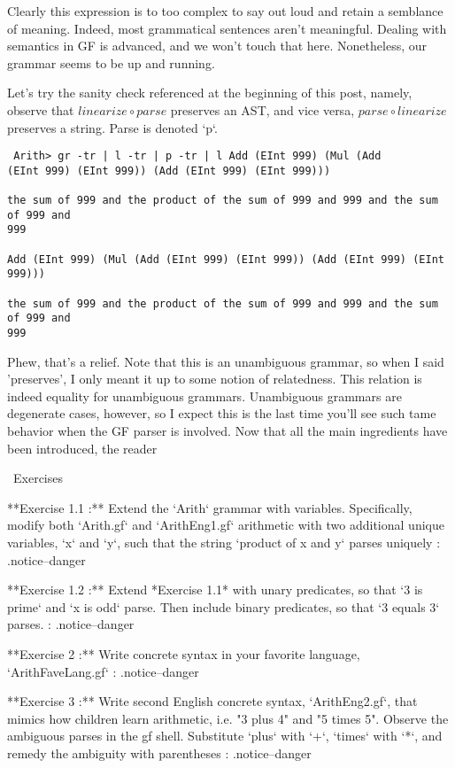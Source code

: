 Clearly this expression is to too complex to say out loud and retain a semblance
of meaning. Indeed, most grammatical sentences aren't meaningful. Dealing with
semantics in GF is advanced, and we won't touch that here. Nonetheless, our
grammar seems to be up and running.

Let's try the sanity check referenced at the beginning of this post, namely,
observe that $linearize \circ parse$ preserves an AST, and vice versa, $parse
\circ linearize$ preserves a string. Parse is denoted `p`.

\begin{verbatim} Arith> gr -tr | l -tr | p -tr | l Add (EInt 999) (Mul (Add
(EInt 999) (EInt 999)) (Add (EInt 999) (EInt 999)))

the sum of 999 and the product of the sum of 999 and 999 and the sum of 999 and
999

Add (EInt 999) (Mul (Add (EInt 999) (EInt 999)) (Add (EInt 999) (EInt 999)))

the sum of 999 and the product of the sum of 999 and 999 and the sum of 999 and
999
\end{verbatim}

Phew, that's a relief. Note that this is an unambiguous grammar, so when I said
'preserves', I only meant it up to some notion of relatedness. This relation is
indeed equality for unambiguous grammars. Unambiguous grammars are degenerate
cases, however, so I expect this is the last time you'll see such tame behavior
when the GF parser is involved. Now that all the main ingredients have been
introduced, the reader

\ Exercises

**Exercise 1.1 :** Extend the `Arith` grammar with variables. Specifically,
modify both `Arith.gf` and `ArithEng1.gf` arithmetic with two additional unique
variables, `x` and `y`, such that the string `product of x and y` parses
uniquely {: .notice--danger}

**Exercise 1.2 :** Extend *Exercise 1.1* with unary predicates, so that `3 is
prime` and `x is odd` parse. Then include binary predicates, so that `3 equals
3` parses. {: .notice--danger}

**Exercise 2 :** Write concrete syntax in your favorite language,
`ArithFaveLang.gf` {: .notice--danger}

**Exercise 3 :** Write second English concrete syntax, `ArithEng2.gf`, that
mimics how children learn arithmetic, i.e. "3 plus 4" and "5 times 5". Observe
the ambiguous parses in the gf shell. Substitute `plus` with `+`, `times` with
`*`, and remedy the ambiguity with parentheses {: .notice--danger}

